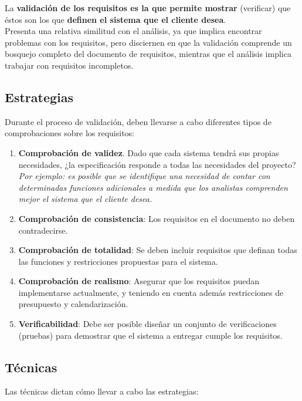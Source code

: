 La \textbf{validación de los requisitos es la que permite mostrar} (verificar) que éstos son los que \textbf{definen el sistema que el cliente desea}.\\

Presenta una relativa similitud con el análisis, ya que implica encontrar problemas con los requisitos, pero disciernen en que la validación comprende un bosquejo completo del documento de requisitos, mientras que el análisis implica trabajar con requisitos incompletos.

\subsection{Estrategias}

Durante el proceso de validación, deben llevarse a cabo diferentes tipos de comprobaciones sobre los requisitos:

\begin{enumerate}
    \item \textbf{Comprobación de validez}. Dado que cada sistema tendrá sus propias necesidades, ¿la especificación responde a todas las necesidades del proyecto? \textit{Por ejemplo: es posible que se identifique una necesidad de contar con determinadas funciones adicionales a medida que los analistas comprenden mejor el sistema que el cliente desea.}
    \item \textbf{Comprobación de consistencia}: Los requisitos en el documento no deben contradecirse.
    \item \textbf{Comprobación de totalidad}: Se deben incluir requisitos que definan todas las funciones y restricciones propuestas para el sistema.
    \item \textbf{Comprobación de realismo}: Asegurar que los requisitos puedan implementarse actualmente, y teniendo en cuenta además restricciones de presupuesto y calendarización.
    \item \textbf{Verificabilidad}: Debe ser posible diseñar un conjunto de verificaciones (pruebas) para demostrar que el sistema a entregar cumple los requisitos.
\end{enumerate}

\subsection{Técnicas}

Las técnicas dictan cómo llevar a cabo las estrategias:

